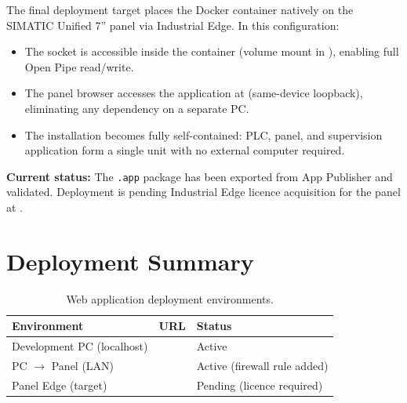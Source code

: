 The final deployment target places the Docker container natively on the
SIMATIC Unified 7\textquotedblright{} panel via Industrial Edge. In this configuration:
\begin{itemize}[leftmargin=*, itemsep=3pt]
  \item The  socket is accessible inside the container
    (volume mount in ), enabling full Open Pipe read/write.
  \item The panel browser accesses the application at 
    (same-device loopback), eliminating any dependency on a separate PC.
  \item The installation becomes fully self-contained: PLC, panel, and supervision
    application form a single unit with no external computer required.
\end{itemize}

\textbf{Current status:} The \texttt{.app} package has been exported from App Publisher
and validated. Deployment is pending Industrial Edge licence acquisition for the panel at
.

\section{Deployment Summary}

\begin{table}[H]
  \centering
  \caption{Web application deployment environments.}
  \label{tab:deploy}
  \begin{tabular}{@{}L{4.5cm}L{5.5cm}L{3.5cm}@{}}
    \toprule
    \textbf{Environment} & \textbf{URL} & \textbf{Status} \\
    \midrule
    Development PC (localhost)
      & 
      & Active \\
    PC $\rightarrow$ Panel (LAN)
      & 
      & Active (firewall rule added) \\
    Panel Edge (target)
      & 
      & Pending (licence required) \\
    \bottomrule
  \end{tabular}
\end{table}
